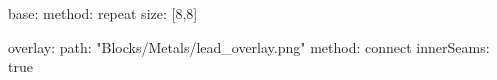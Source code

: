 base:
  method: repeat
  size: [8,8]
  
overlay:
  path: "Blocks/Metals/lead_overlay.png"
  method: connect
  innerSeams: true